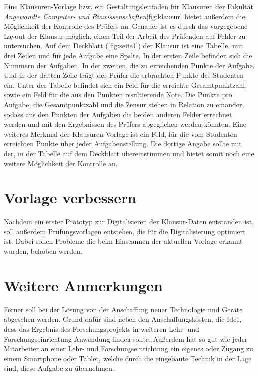 \documentclass[nomenclature, oneside, 150]{HSMW-Thesis}
\begin{document}
	Eine Klausuren-Vorlage bzw. ein Gestaltungsleitfaden für Klausuren der Fakultät \textit{Angewandte Computer- und Biowissenschaften}\ref{fig:klausur} bietet außerdem die Möglichkeit der Kontrolle des Prüfers an. Genauer ist es durch das vorgegebene Layout der Klausur möglich, einen Teil der Arbeit des Prüfenden auf Fehler zu untersuchen. Auf dem Deckblatt (\ref{fig:seite1}) der Klausur ist eine Tabelle, mit drei Zeilen und für jede Aufgabe eine Spalte. In der ersten Zeile befinden sich die Nummern der Aufgaben. In der zweiten, die zu erreichenden Punkte der Aufgabe. Und in der dritten Zeile trägt der Prüfer die erbrachten Punkte des Studenten ein. Unter der Tabelle befindet sich ein Feld für die erreichte Gesamtpunktzahl, sowie ein Feld für die aus den Punkten resultierende Note. Die Punkte pro Aufgabe, die Gesamtpunktzahl und die Zensur stehen in Relation zu einander, sodass aus den Punkten der Aufgaben die beiden anderen Felder errechnet werden und mit den Ergebnissen des Prüfers abgeglichen werden könnten. Eine weiteres Merkmal der Klausuren-Vorlage ist ein Feld, für die vom Studenten erreichten Punkte über jeder Aufgabenstellung. Die dortige Angabe sollte mit der, in der Tabelle auf dem Deckblatt übereinstimmen und bietet somit noch eine weitere Möglichkeit der Kontrolle an.
	
	\section{Vorlage verbessern}
	Nachdem ein erster Prototyp zur Digitalisieren der Klausur-Daten entstanden ist, soll außerdem Prüfungsvorlagen entstehen, die für die Digitalisierung optimiert ist. Dabei sollen Probleme die beim Einscannen der aktuellen Vorlage erkannt wurden, behoben werden. 
	
	\section{Weitere Anmerkungen}
	Ferner soll bei der Lösung von der Anschaffung neuer Technologie und Geräte abgesehen werden. Grund dafür sind neben den Anschaffungskosten, die Idee, dass das Ergebnis des Forschungsprojekts in weiteren Lehr- und Forschungseinrichtung Anwendung finden sollte. Außerdem hat so gut wie jeder Mitarbeiter an einer Lehr- und Forschungseinrichtung ein eigenes oder Zugang zu einem Smartphone oder Tablet, welche durch die eingebaute Technik in der Lage sind, diese Aufgabe zu übernehmen. 

\end{document}
